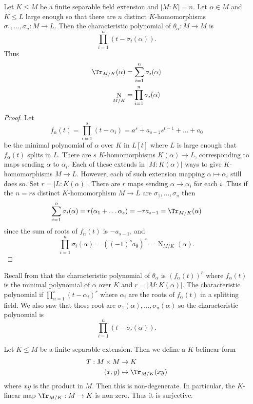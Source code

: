 \documentclass[a4paper]{article}
\DeclareMathOperator{\n}{N}
\begin{document}
\begin{theorem}
  \label{thm:trace and norm of separable extension}
  Let \(K \leq M\) be a finite separable field extension and \(|M:K| = n\). Let \(\alpha \in M\) and \(K \leq L\) large enough so that there are \(n\) distinct \(K\)-homomorphisms \(\sigma_1, \dots, \sigma_n: M \to L\). Then the characteristic polynomial of \(\theta_\alpha: M \to M\) is
  \[
    \prod_{i = 1}^{n}(t - \sigma_i(\alpha)).
  \]
  Thus
  \begin{align*}
    \Tr_{M/K}(\alpha) &= \sum_{i = 1}^{n} \sigma_i(\alpha) \\
    \n_{M/K} &= \prod_{i = 1}^{n} \sigma_i(\alpha)
  \end{align*}
\end{theorem}

\begin{proof}
  Let
  \[
    f_\alpha(t) = \prod_{i = 1}^{s} (t - \alpha_i) = a^s + a_{s - 1}s^{t - 1} + \dots + a_0
  \]
  be the minimal polynomial of \(\alpha\) over \(K\) in \(L[t]\) where \(L\) is large enough that \(f_\alpha(t)\) splits in \(L\). There are \(s\) \(K\)-homomorphisms \(K(\alpha) \to L\), corresponding to maps sending \(\alpha\) to \(\alpha_i\). Each of these extends in \(|M:K(\alpha)|\) ways to give \(K\)-homomorphisms \(M \to L\). However, each of such extension mapping \(\alpha \mapsto \alpha_i\) still does so. Set \(r = |L:K(\alpha)|\). There are \(r\) maps sending \(\alpha \to \alpha_i\) for each \(i\). Thus if the \(n = rs\) distinct \(K\)-homomorphism \(M \to L\) are \(\sigma_1, \dots, \sigma_n\) then
  \[
    \sum_{i = 1}^{n} \sigma_i(\alpha) = r(\alpha_1 + \dots \alpha_s) = -ra_{s - 1} = \Tr_{M/K} (\alpha)
  \]
  since the sum of roots of \(f_\alpha(t)\) is \(-a_{s - 1}\), and
  \[
    \prod_{i = 1}^{n} \sigma_i(\alpha) = ((-1)^s a_0)^r = \n_{M/K}(\alpha).
  \]
\end{proof}

Recall from  that the characteristic polynomial of \(\theta_\alpha\) is \((f_\alpha(t))^r\) where \(f_\alpha(t)\) is the minimal polynomial of \(\alpha\) over \(K\) and \(r = |M:K(\alpha)|\). The characteristic polynomial if \(\prod_{n = 1}^{s} (t - \alpha_i)^r\) where \(\alpha_i\) are the roots of \(f_\alpha(t)\) in a splitting field. We also saw that those root are \(\sigma_1(\alpha), \dots, \sigma_n(\alpha)\) so the characteristic polynomial is
\[
  \prod_{i = 1}^{n} (t - \sigma_i(\alpha)).
\]

\begin{theorem}
  Let \(K \leq M\) be a finite separable extension. Then we define a \(K\)-belinear form
  \begin{align*}
    T: M \times M &\to K \\
    (x, y) &\mapsto \Tr_{M/K}(xy)
  \end{align*}
  where \(xy\) is the product in \(M\). Then this is non-degenerate. In particular, the \(K\)-linear map \(\Tr_{M/K}: M \to K\) is non-zero. Thus it is surjective.
\end{theorem}
\end{document}
